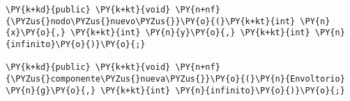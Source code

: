 \begin{Verbatim}[commandchars=\\\{\}]
\PY{k+kd}{public} \PY{k+kt}{void} \PY{n+nf}{\PYZus{}nodo\PYZus{}nuevo\PYZus{}}\PY{o}{(}\PY{k+kt}{int} \PY{n}{x}\PY{o}{,} \PY{k+kt}{int} \PY{n}{y}\PY{o}{,} \PY{k+kt}{int} \PY{n}{infinito}\PY{o}{)}\PY{o}{;}

\PY{k+kd}{public} \PY{k+kt}{void} \PY{n+nf}{\PYZus{}componente\PYZus{}nueva\PYZus{}}\PY{o}{(}\PY{n}{Envoltorio} \PY{n}{g}\PY{o}{,} \PY{k+kt}{int} \PY{n}{infinito}\PY{o}{)}\PY{o}{;}
\end{Verbatim}
